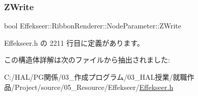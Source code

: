 \subsubsection{\texorpdfstring{Z\+Write}{ZWrite}}
{\footnotesize\ttfamily bool Effekseer\+::\+Ribbon\+Renderer\+::\+Node\+Parameter\+::\+Z\+Write}



 Effekseer.\+h の 2211 行目に定義があります。



この構造体詳解は次のファイルから抽出されました\+:\begin{DoxyCompactItemize}
\item 
C\+:/\+H\+A\+L/\+P\+G関係/03\+\_\+作成プログラム/03\+\_\+\+H\+A\+L授業/就職作品/\+Project/source/05\+\_\+\+Resource/\+Effekseer/\mbox{\hyperlink{_effekseer_8h}{Effekseer.\+h}}\end{DoxyCompactItemize}
